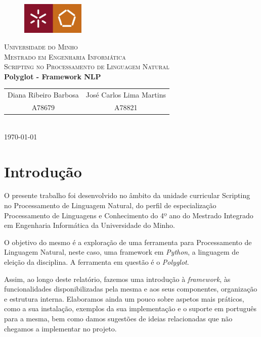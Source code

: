 \documentclass{article}
\begin{document}
{
\center
\begin{figure}[H]
        \centering
        \includegraphics[width=3cm]{Pictures/UM_EENG.jpg}
\end{figure}
\textsc{\Large Universidade do Minho} \\ [0.5cm]
\textsc{\Large Mestrado em Engenharia Informática} \\ [0.5cm]
\textsc{\large Scripting no Processamento de Linguagem Natural} \\ [0.5cm]

{\LARGE \bfseries Polyglot - Framework NLP} \\[0.5cm]

\begin{tabular}{c c}
    Diana Ribeiro Barbosa & José Carlos Lima Martins \\
    A78679 & A78821 \\
\end{tabular} \\[0.5cm]

\today \\[1cm]
}

\tableofcontents

\newpage
\section{Introdução}
\qquad O presente trabalho foi desenvolvido no âmbito da unidade curricular Scripting no Processamento de Linguagem Natural, do perfil de especialização Processamento de Linguagens e Conhecimento do 4º ano do Mestrado Integrado em Engenharia Informática da Universidade do Minho.
\par O objetivo do mesmo é a exploração de uma ferramenta para Processamento de Linguagem Natural, neste caso, uma framework em \textit{Python}, a linguagem de eleição da disciplina. A ferramenta em questão é o \textit{Polyglot}.
\par Assim, ao longo deste relatório, fazemos uma  introdução à \textit{framework}, às funcionalidades disponibilizadas pela mesma e aos seus componentes, organização e estrutura interna. Elaboramos ainda um pouco sobre aspetos mais práticos, como a sua instalação, exemplos da sua implementação e o suporte em português para a mesma, bem como damos sugestões de ideias relacionadas que não chegamos a implementar no projeto.
\end{document}
